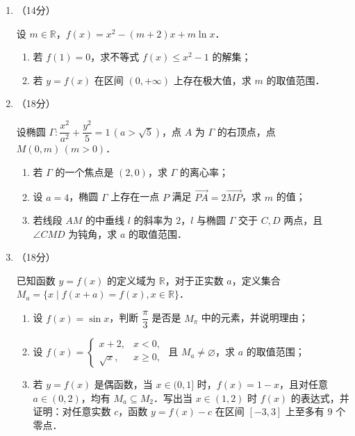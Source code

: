 \begin{description}
\begin{enumerate}[leftmargin=5pt]
        \item （14分）

        设 $m\in\mathbb{R}$，$f(x)=x^2-(m+2)x+m\ln x$．

        \begin{enumerate}[label=(\arabic*)]
            \item 若 $f(1)=0$，求不等式 $f(x)\leqslant x^2-1$ 的解集；
            \item 若 $y=f(x)$ 在区间 $(0,+\infty)$ 上存在极大值，求 $m$ 的取值范围．
        \end{enumerate}

        \item （18分）

        设椭圆 $\Gamma:\dfrac{x^2}{a^2}+\dfrac{y^2}{5}=1\,(a>\sqrt{5})$，点 $A$ 为 $\Gamma$ 的右顶点，点 $M(0,m)\,(m>0)$．

        \begin{enumerate}[label=(\arabic*)]
            \item 若 $\Gamma$ 的一个焦点是 $(2,0)$，求 $\Gamma$ 的离心率；
            \item 设 $a=4$，椭圆 $\Gamma$ 上存在一点 $P$ 满足 $\overrightarrow{PA}=2\overrightarrow{MP}$，求 $m$ 的值；
            \item 若线段 $AM$ 的中垂线 $l$ 的斜率为 $2$，$l$ 与椭圆 $\Gamma$ 交于 $C,D$ 两点，且 $\angle CMD$ 为钝角，求 $a$ 的取值范围．
        \end{enumerate}

        \item （18分）

        已知函数 $y=f(x)$ 的定义域为 $\mathbb{R}$，对于正实数 $a$，定义集合 $M_a=\{x\mid f(x+a)=f(x),x\in\mathbb{R}\}$．

        \begin{enumerate}[label=(\arabic*)]
            \item 设 $f(x)=\sin x$，判断 $\dfrac{\pi}{3}$ 是否是 $M_\pi$ 中的元素，并说明理由；
            \item 设 $f(x)=\begin{cases}x+2,&x<0,\\\sqrt{x},&x\geqslant0,\end{cases}$ 且 $M_a\neq\varnothing$，求 $a$ 的取值范围；
            \item 若 $y=f(x)$ 是偶函数，当 $x\in(0,1]$ 时，$f(x)=1-x$，且对任意 $a\in(0,2)$，均有 $M_a\subseteq M_2$．写出当 $x\in(1,2)$ 时 $f(x)$ 的表达式，并证明：对任意实数 $c$，函数 $y=f(x)-c$ 在区间 $[-3,3]$ 上至多有 $9$ 个零点．
        \end{enumerate}
    \end{enumerate}
\end{description}
\clearpage


